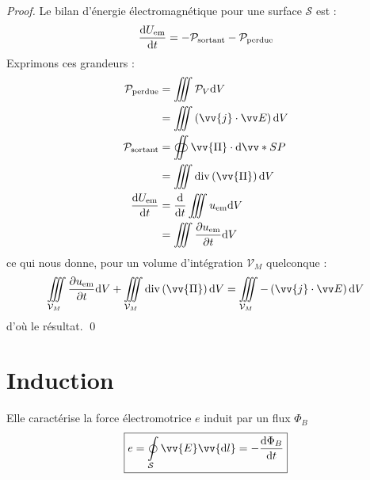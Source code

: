 \documentclass[11pt,a4paper,fleqn,pdftex]{report}
\begin{document}
\begin{proof}
  Le bilan d'énergie électromagnétique pour une surface $\mathcal{S}$ est :
  \begin{equation}
  \dfrac{\mathrm{d} U_{\text{em}}}{\mathrm{d} t} = -\mathcal{P}_\text{sortant} - \mathcal{P}_\text{perdue}
  \end{equation}
  Exprimons ces grandeurs : 
   \begin{align*}
      \mathcal{P}_\text{perdue}  &= \iiint \mathcal{P}_V \d V\\
                                 &= \iiint \left(\vv{j}\cdot \E{}\right)\d V\\
      \mathcal{P}_\text{sortant} &= \oiint  \vv{\Pi}  \cdot \d\vv*{S}{P} \\
                                 &= \iiint \diverg[\vv{\Pi}] \d V \\
  \dfrac{\d U_{\text{em}}}{\d t} &= \frac{\d}{\d t}\iiint u_\text{em} \d V\\
                                 &= \iiint \dfrac{\partial u_\text{em}}{\partial t}\d V
   \end{align*}
   ce qui nous donne, pour un volume d'intégration $\mathcal{V}_M$ quelconque : 
   \begin{equation*}
   \iiint \limits_{\mathcal{V}_M} \dfrac{\partial u_\text{em}}{\partial t}\d V + \iiint \limits_{\mathcal{V}_M} \diverg[\vv{\Pi}] \d V = \iiint \limits_{\mathcal{V}_M} -\left(\vv{j}\cdot \E{}\right)\d V
   \end{equation*}
   d'où le résultat. \qed
\end{proof}
\section{Induction}
\begin{theorem}
Elle caractérise la force électromotrice $e$ induit par un flux $\Phi_B$
\begin{equation}\label{Faraday}
\boxed{e=\oint \limits_\mathcal{S} \vv{E} \vv{\d l} =-\dfrac{\d\Phi_B}{\d t}}
\end{equation}
\end{theorem}
%
\end{document}
